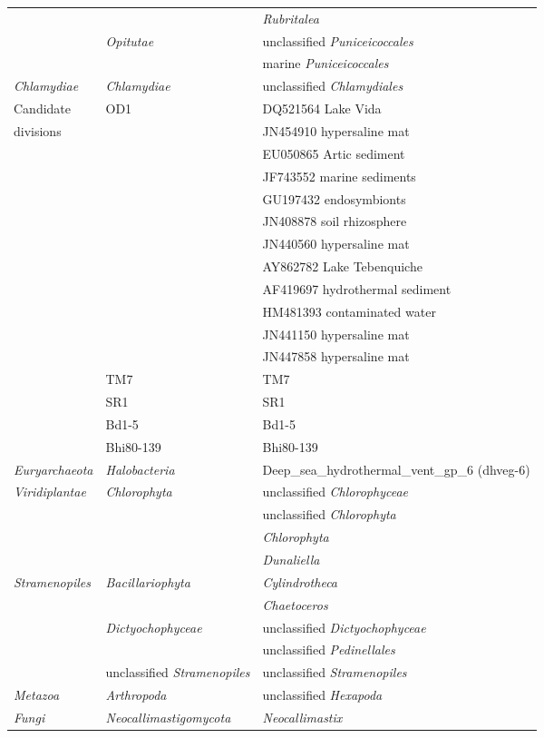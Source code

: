 \begin{longtable}{p{2.5cm}p{4cm}p{7cm}}
 &  & \emph{Rubritalea} \\
 & \emph{Opitutae} & unclassified \emph{Puniceicoccales} \\
 &  & marine \emph{Puniceicoccales} \\
\emph{Chlamydiae} & \emph{Chlamydiae} & unclassified \emph{Chlamydiales} \\
Candidate & OD1 & DQ521564 Lake Vida  \\
divisions &  & JN454910 hypersaline mat  \\
 &  & EU050865 Artic sediment  \\
 &  & JF743552 marine sediments  \\
 &  & GU197432 endosymbionts \\
 &  & JN408878 soil rhizosphere \\
 &  & JN440560 hypersaline mat  \\
 &  & AY862782 Lake Tebenquiche \\
 &  & AF419697 hydrothermal sediment  \\
 &  & HM481393 contaminated water  \\
 &  & JN441150 hypersaline mat  \\
 &  & JN447858 hypersaline mat  \\
 & TM7  & TM7 \\
 & SR1 & SR1 \\
 & Bd1-5  & Bd1-5  \\
 & Bhi80-139  & Bhi80-139  \\
\emph{Euryarchaeota} & \emph{Halobacteria} & Deep\_sea\_hydrothermal\_vent\_gp\_6 (dhveg-6) \\
\emph{Viridiplantae} & \emph{Chlorophyta} & unclassified \emph{Chlorophyceae} \\
 &  & unclassified \emph{Chlorophyta} \\
 &  & \emph{Chlorophyta} \\
 &  & \emph{Dunaliella} \\
 \emph{Stramenopiles} &  \emph{Bacillariophyta} & \emph{Cylindrotheca} \\
 &  & \emph{Chaetoceros} \\
 & \emph{Dictyochophyceae} & unclassified \emph{Dictyochophyceae} \\
 &  & unclassified \emph{Pedinellales} \\
 & unclassified \emph{Stramenopiles} & unclassified \emph{Stramenopiles} \\
\emph{Metazoa} & \emph{Arthropoda} & unclassified \emph{Hexapoda} \\
\emph{Fungi}  & \emph{Neocallimastigomycota}  & \emph{Neocallimastix} \\

\end{longtable}
